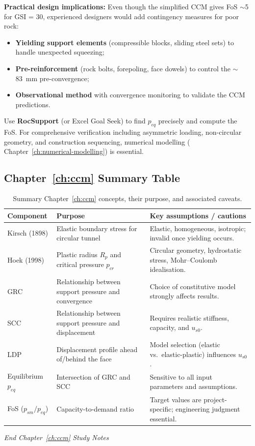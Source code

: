 \begin{warnbox}[GSI = 30 — solving the GRC--SCC intersection]
\textbf{Practical design implications:} Even though the simplified CCM gives FoS $\sim$5 for GSI = 30, experienced designers would add contingency measures for poor rock:
\begin{itemize}[nosep]
 \item \textbf{Yielding support elements} (compressible blocks, sliding steel sets) to handle unexpected squeezing;
 \item \textbf{Pre-reinforcement} (rock bolts, forepoling, face dowels) to control the $\sim$83~mm pre-convergence;
 \item \textbf{Observational method} with convergence monitoring to validate the CCM predictions.
\end{itemize}
Use \textbf{RocSupport} (or Excel Goal Seek) to find $p_{eq}$ precisely and compute the FoS. For comprehensive verification including asymmetric loading, non-circular geometry, and construction sequencing, numerical modelling ( Chapter~\ref{ch:numerical-modelling}) is essential.
\end{warnbox}

\subsection{ Chapter~\ref{ch:ccm} Summary Table}
\begin{table}[h!]
\centering
\begin{tabularx}{\textwidth}{l X X}
\toprule
\textbf{Component} & \textbf{Purpose} & \textbf{Key assumptions / cautions} \\
\midrule
Kirsch (1898) & Elastic boundary stress for circular tunnel & Elastic, homogeneous, isotropic; invalid once yielding occurs. \\
Hoek (1998) & Plastic radius $R_p$ and critical pressure $p_{cr}$ & Circular geometry, hydrostatic stress, Mohr--Coulomb idealisation. \\
GRC & Relationship between support pressure and convergence & Choice of constitutive model strongly affects results. \\
SCC & Relationship between support pressure and displacement & Requires realistic stiffness, capacity, and $u_{s0}$. \\
LDP & Displacement profile ahead of/behind the face & Model selection (elastic vs.\ elastic-plastic) influences $u_{s0}$. \\
Equilibrium $p_{eq}$ & Intersection of GRC and SCC & Sensitive to all input parameters and assumptions. \\
FoS ($p_{sm}/p_{eq}$) & Capacity-to-demand ratio & Target values are project-specific; engineering judgment essential. \\
\bottomrule
\end{tabularx}
\caption{Summary Chapter~\ref{ch:ccm} concepts, their purpose, and associated caveats.}
\end{table}

\vspace{1cm}
\noindent\textit{End Chapter~\ref{ch:ccm} Study Notes}
